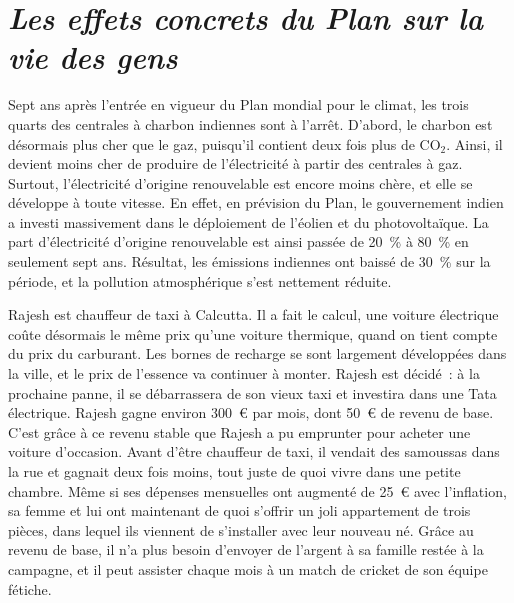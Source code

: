 \documentclass[a5paper,french,openany]{memoir}
\begin{document}
\chapter*{\textit{Les effets concrets du Plan sur la vie des gens}}\label{ch:narr_bilan}

Sept ans après l'entrée en vigueur du Plan mondial pour le climat, les trois quarts des centrales à charbon indiennes sont à l'arrêt. D'abord, le charbon est désormais plus cher que le gaz, puisqu'il contient deux fois plus de CO$_\text{2}$. Ainsi, il devient moins cher de produire de l'électricité à partir des centrales à gaz. Surtout, l'électricité d'origine renouvelable est encore moins chère, et elle se développe à toute vitesse. En effet, en prévision du Plan, le gouvernement indien a investi massivement dans le déploiement de l'éolien et du photovoltaïque. La part d'électricité d'origine renouvelable est ainsi passée de 20~\% à 80~\% en seulement sept ans. Résultat, les émissions indiennes ont baissé de 30~\% sur la période, et la pollution atmosphérique s'est nettement réduite. 

Rajesh est chauffeur de taxi à Calcutta. Il a fait le calcul, une voiture électrique coûte désormais le même prix qu'une voiture thermique, quand on tient compte du prix du carburant. Les bornes de recharge se sont largement développées dans la ville, et le prix de l'essence va continuer à monter. Rajesh est décidé~: à la prochaine panne, il se débarrassera de son vieux taxi et investira dans une Tata électrique. Rajesh gagne environ 300~\euro{} par mois, dont 50~\euro{} de revenu de base. C'est grâce à ce revenu stable que Rajesh a pu emprunter pour acheter une voiture d'occasion. %
Avant d'être chauffeur de taxi, il vendait des samoussas dans la rue et gagnait deux fois moins, tout juste de quoi vivre dans une petite chambre. Même si ses dépenses mensuelles ont augmenté de 25~\euro{} avec l'inflation, sa femme et lui ont maintenant de quoi s'offrir un joli appartement de trois pièces, dans lequel ils viennent de s'installer avec leur nouveau né. Grâce au revenu de base, il n'a plus besoin d'envoyer de l'argent à sa famille restée à la campagne, et il peut assister chaque mois à un match de cricket de son équipe fétiche. 
\end{document}
